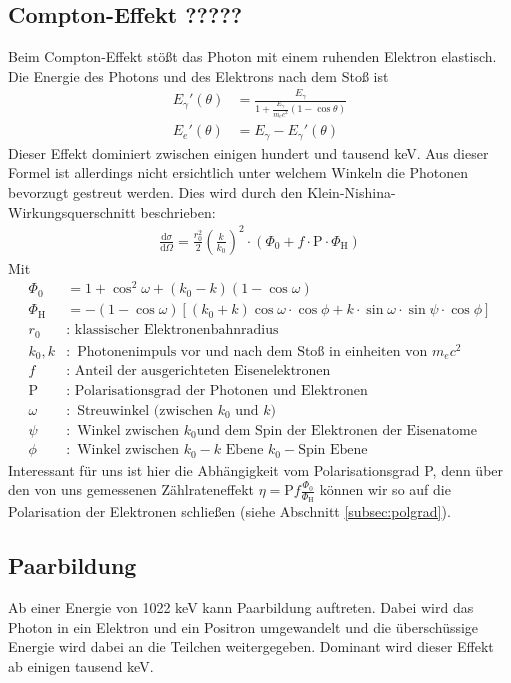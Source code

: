 \documentclass[twoside,colorback,accentcolor=tud4c,11pt]{tudreport}
\begin{document}
\subsection{Compton-Effekt ?????}
Beim Compton-Effekt stößt das Photon mit einem ruhenden Elektron elastisch. Die Energie des Photons und des Elektrons nach dem Stoß ist 
\begin{align}
E_\gamma'(\theta)&=\frac{E_\gamma}{1+\frac{E_\gamma}{m_ec^2}(1-\cos\theta)}\\
E_e'(\theta)&=E_\gamma-E_\gamma'(\theta)
\end{align}
Dieser Effekt dominiert zwischen einigen hundert und tausend keV. Aus dieser Formel ist allerdings nicht ersichtlich unter welchem Winkeln die Photonen bevorzugt gestreut werden. Dies wird durch den Klein-Nishina-Wirkungsquerschnitt beschrieben:
\begin{align}
\frac{\text{d}\sigma}{\text{d}\Omega}=\frac{r_0^2}{2}\left(\frac{k}{k_0}\right)^2\cdot\left(\Phi_0+f\cdot\text{P}\cdot\Phi_\text{H}\right)
\end{align}
Mit 
\begin{align*}
\Phi_0&=1+\cos^2\omega+(k_0-k)(1-\cos\omega)\\
\Phi_\text{H}&=-(1-\cos\omega)[(k_0+k)\cos\omega\cdot\cos\phi+k\cdot\sin\omega\cdot\sin\psi\cdot\cos\phi]\\
r_0&:\text{ klassischer Elektronenbahnradius}\\
k_0,k&:\text{ Photonenimpuls vor und nach dem Stoß in einheiten von }m_ec^2\\
f&:\text{ Anteil der ausgerichteten Eisenelektronen}\\
\text{P}&:\text{ Polarisationsgrad der Photonen und Elektronen}\\
\omega&:\text{ Streuwinkel (zwischen }k_0\text{ und }k)\\
\psi&:\text{ Winkel zwischen }k_0\text{und dem Spin der Elektronen der Eisenatome}\\
\phi&:\text{ Winkel zwischen }k_0-k\text{ Ebene }k_0-\text{Spin Ebene}
\end{align*}
Interessant für uns ist hier die Abhängigkeit vom Polarisationsgrad P, denn über den von uns gemessenen Zählrateneffekt $\eta=\text{P}f\frac{\Phi_0}{\Phi_\text{H}}$ können wir so auf die Polarisation der Elektronen schließen (siehe Abschnitt \ref{subsec:polgrad}).
\subsection{Paarbildung}
Ab einer Energie von 1022 keV kann Paarbildung auftreten. Dabei wird das Photon in ein Elektron und ein Positron umgewandelt und die überschüssige Energie wird dabei an die Teilchen weitergegeben. Dominant wird dieser Effekt ab einigen tausend keV.
\end{document}
